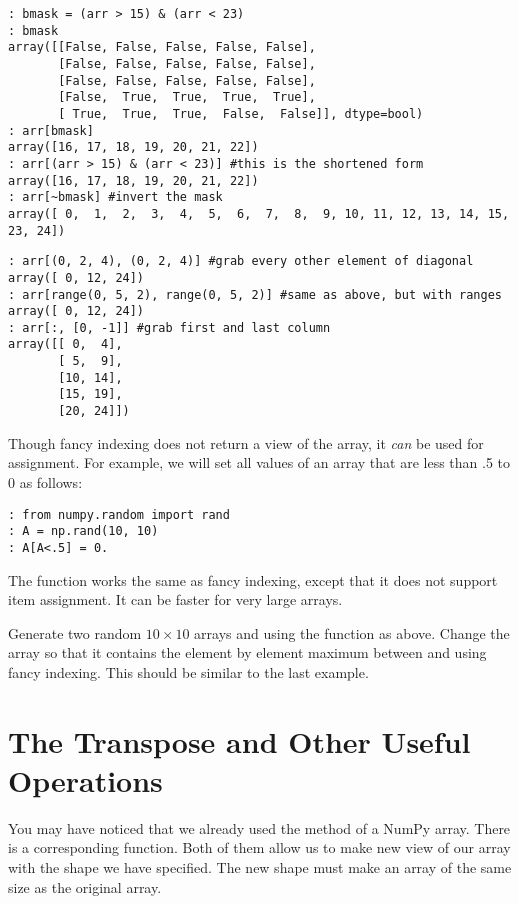 \begin{lstlisting}
: bmask = (arr > 15) & (arr < 23)
: bmask
array([[False, False, False, False, False],
       [False, False, False, False, False],
       [False, False, False, False, False],
       [False,  True,  True,  True,  True],
       [ True,  True,  True,  False,  False]], dtype=bool)
: arr[bmask]
array([16, 17, 18, 19, 20, 21, 22])
: arr[(arr > 15) & (arr < 23)] #this is the shortened form
array([16, 17, 18, 19, 20, 21, 22])
: arr[~bmask] #invert the mask
array([ 0,  1,  2,  3,  4,  5,  6,  7,  8,  9, 10, 11, 12, 13, 14, 15, 23, 24])
\end{lstlisting}

\begin{lstlisting}
: arr[(0, 2, 4), (0, 2, 4)] #grab every other element of diagonal
array([ 0, 12, 24])
: arr[range(0, 5, 2), range(0, 5, 2)] #same as above, but with ranges
array([ 0, 12, 24])
: arr[:, [0, -1]] #grab first and last column
array([[ 0,  4],
       [ 5,  9],
       [10, 14],
       [15, 19],
       [20, 24]])
\end{lstlisting}

Though fancy indexing does not return a view of the array, it \emph{can} be used for assignment.
For example, we will set all values of an array that are less than .5 to 0 as follows:
\begin{lstlisting}
: from numpy.random import rand
: A = np.rand(10, 10)
: A[A<.5] = 0.
\end{lstlisting}

The  function works the same as fancy indexing, except that it does not support item assignment.
It can be faster for very large arrays.

\begin{problem}
Generate two random $10 \times 10$ arrays  and  using the  function as above.
Change the array  so that it contains the element by element maximum between  and  using fancy indexing.
This should be similar to the last example.
\end{problem}

\section*{The Transpose and Other Useful Operations}
You may have noticed that we already used the  method of a NumPy array.
There is a corresponding  function.
Both of them allow us to make new view of our array with the shape we have specified.
The new shape must make an array of the same size as the original array.

